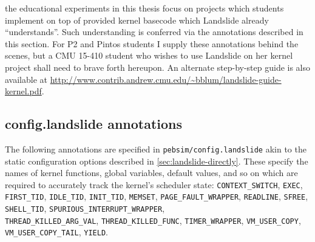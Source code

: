 the educational experiments in this thesis focus on projects which students implement
on top of provided kernel basecode which Landslide already ``understands''.
Such understanding is conferred via the annotations described in this section.
For P2 and Pintos students I supply these annotations behind the scenes,
but a CMU 15-410 student who wishes to use Landslide on her kernel project shall need to brave forth hereupon.
An alternate step-by-step guide is also available at
\url{http://www.contrib.andrew.cmu.edu/~bblum/landslide-guide-kernel.pdf}.


\subsection{config.landslide annotations}
\label{sec:landslide-config-landslide}

The following annotations are specified in {\tt pebsim/config.landslide} akin to the static configuration options
described in \cref{sec:landslide-directly}.
These specify the names of kernel functions, global variables, default values, and so on
which are required to accurately track the kernel's scheduler state:
{\tt CONTEXT\_SWITCH},
{\tt EXEC},
{\tt FIRST\_TID},
{\tt IDLE\_TID},
{\tt INIT\_TID},
{\tt MEMSET},
{\tt PAGE\_FAULT\_WRAPPER},
{\tt READLINE},
{\tt SFREE},
{\tt SHELL\_TID},
{\tt SPURIOUS\_INTERRUPT\_WRAPPER},
\\
{\tt THREAD\_KILLED\_ARG\_VAL},
{\tt THREAD\_KILLED\_FUNC},
{\tt TIMER\_WRAPPER},
{\tt VM\_USER\_COPY},
\\
{\tt VM\_USER\_COPY\_TAIL},
{\tt YIELD}.

